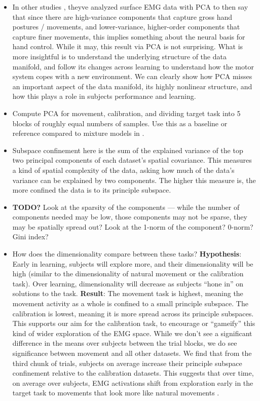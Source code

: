 \documentclass[../main.tex]{subfiles}
\begin{document}
\begin{itemize}
  \setlength\itemsep{0em}
  \item In other studies \rbrack, theyve analyzed surface EMG data with PCA to then say that since there are high-variance components that capture gross hand postures / movements, and lower-variance, higher-order components that capture finer movements, this implies something about the neural basis for hand control. While it may, this result via PCA is not surprising. What is more insightful is to understand the underlying structure of the data manifold, and follow its changes across learning to understand how the motor system copes with a new environment. We can clearly show how PCA misses an important aspect of the data manifold, its highly nonlinear structure, and how this plays a role in subjects performance and learning.
  \item Compute PCA for movement, calibration, and dividing target task into 5 blocks of roughly equal numbers of samples. Use this as a baseline or reference compared to mixture models in . 
  \item Subspace confinement here is the sum of the explained variance of the top two principal components of each dataset's spatial covariance. This measures a kind of spatial complexity of the data, asking how much of the data's variance can be explained by two components. The higher this measure is, the more confined the data is to its principle subspace.
  \item \textbf{TODO?} Look at the sparsity of the components --- while the number of components needed may be low, those components may not be sparse, they may be spatially spread out? Look at the 1-norm of the component? 0-norm? Gini index?
  \item How does the dimensionality compare between these tasks? \textbf{Hypothesis}: Early in learning, subjects will explore more, and their dimensionality will be high (similar to the dimensionality of natural movement or the calibration task). Over learning, dimensionality will decrease as subjects “hone in” on solutions to the task. \textbf{Result}: The movement task is highest, meaning the movement activity as a whole is confined to a small principle subspace. The calibration is lowest, meaning it is more spread across its principle subspaces. This supports our aim for the calibration task, to encourage or ``gameify'' this kind of wider exploration of the EMG space. While we don't see a significant difference in the means over subjects between the trial blocks, we do see significance between movement and all other datasets. We find that from the third chunk of trials, subjects on average increase their principle subspace confinement relative to the calibration datasets. This suggests that over time, on average over subjects, EMG activations shift from exploration early in the target task to movements that look more like natural movements .

\end{itemize}
\end{document}

